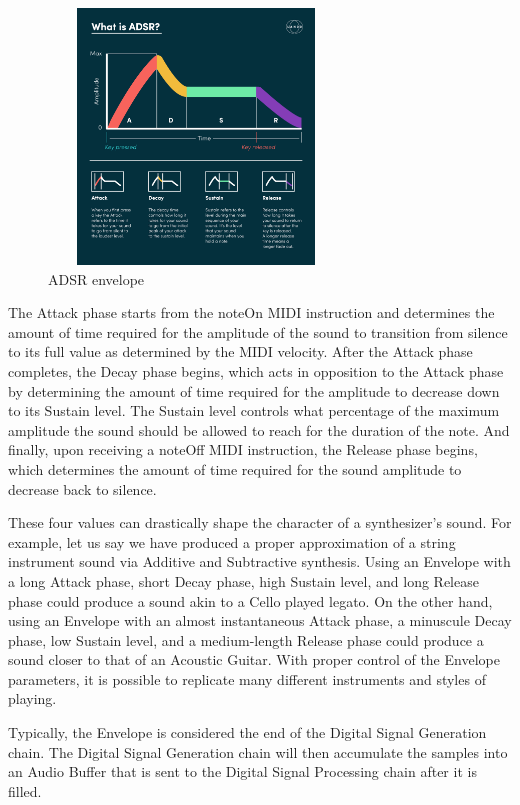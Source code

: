 \documentclass[a4paper,12pt]{report}
\begin{document}
\begin{figure}[h]
    \centering
    \includegraphics[width=0.7\textwidth,height=6.8cm]{ADSRExplained.jpg}
    \caption{ADSR envelope \cite{adsrenvinfo}}
    \label{fig:ADSRExplained}
\end{figure}

The Attack phase starts from the noteOn MIDI instruction and determines the amount of time required for the amplitude of the sound to transition from silence to its full value as determined by the MIDI velocity. After the Attack phase completes, the Decay phase begins, which acts in opposition to the Attack phase by determining the amount of time required for the amplitude to decrease down to its Sustain level. The Sustain level controls what percentage of the maximum amplitude the sound should be allowed to reach for the duration of the note. And finally, upon receiving a noteOff MIDI instruction, the Release phase begins, which determines the amount of time required for the sound amplitude to decrease back to silence.

These four values can drastically shape the character of a synthesizer's sound. For example, let us say we have produced a proper approximation of a string instrument sound via Additive and Subtractive synthesis. Using an Envelope with a long Attack phase, short Decay phase, high Sustain level, and long Release phase could produce a sound akin to a Cello played legato. On the other hand, using an Envelope with an almost instantaneous Attack phase, a minuscule Decay phase, low Sustain level, and a medium-length Release phase could produce a sound closer to that of an Acoustic Guitar. With proper control of the Envelope parameters, it is possible to replicate many different instruments and styles of playing.

Typically, the Envelope is considered the end of the Digital Signal Generation chain. The Digital Signal Generation chain will then accumulate the samples into an Audio Buffer that is sent to the Digital Signal Processing chain after it is filled.
\end{document}
